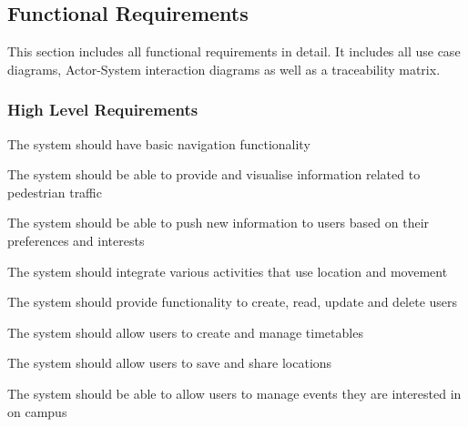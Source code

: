 \documentclass{article}
\begin{document}
	
	\subsection{Functional Requirements}
	This section includes all functional requirements in detail. It includes all use case diagrams, Actor-System interaction diagrams as well as a traceability matrix.	
	\subsubsection{High Level Requirements}
 	\begin{FR}
 		\item The system should have basic navigation functionality 
 		\item The system should be able to provide and visualise information related to pedestrian traffic
 		\item The system should be able to push new information to users based on their preferences and interests
 		\item The system should integrate various activities that use location and movement
 		\item The system should provide functionality to create, read, update and delete users 
 		\item The system should allow users to create and manage timetables
 		\item The system should allow users to save and share locations
 		\item The system should be able to allow users to manage events they are interested in on campus
 	\end{FR}
\end{document}

